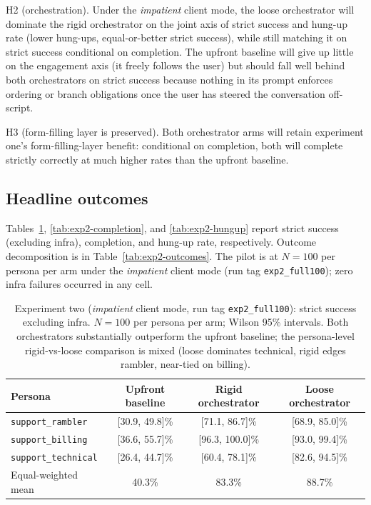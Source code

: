 \documentclass[11pt,a4paper]{article}
\newcommand{\rerunPlaceholderN}{100}
\begin{document}
H2 (orchestration). Under the \emph{impatient} client mode, the loose orchestrator will dominate the rigid orchestrator on the joint axis of strict success and hung-up rate (lower hung-ups, equal-or-better strict success), while still matching it on strict success conditional on completion. The upfront baseline will give up little on the engagement axis (it freely follows the user) but should fall well behind both orchestrators on strict success because nothing in its prompt enforces ordering or branch obligations once the user has steered the conversation off-script.

H3 (form-filling layer is preserved). Both orchestrator arms will retain experiment one's form-filling-layer benefit: conditional on completion, both will complete strictly correctly at much higher rates than the upfront baseline.

\subsection{Headline outcomes}

Tables~\ref{tab:exp2-strict}, \ref{tab:exp2-completion}, and \ref{tab:exp2-hungup} report strict success (excluding infra), completion, and hung-up rate, respectively. Outcome decomposition is in Table~\ref{tab:exp2-outcomes}. The pilot is at $N=\rerunPlaceholderN$ per persona per arm under the \emph{impatient} client mode (run tag \texttt{exp2\_full100}); zero infra failures occurred in any cell.

\begin{table}[htbp]
  \centering
  \caption{Experiment two (\emph{impatient} client mode, run tag \texttt{exp2\_full100}): strict success excluding infra. $N=\rerunPlaceholderN$ per persona per arm; Wilson 95\% intervals. Both orchestrators substantially outperform the upfront baseline; the persona-level rigid-vs-loose comparison is mixed (loose dominates technical, rigid edges rambler, near-tied on billing).}
  \label{tab:exp2-strict}
  \begin{tabular}{lccc}
    \toprule
    Persona & Upfront baseline & Rigid orchestrator & Loose orchestrator \\
    \midrule
    \texttt{support\_rambler}   & [30.9, 49.8]\% & [71.1, 86.7]\%  & [68.9, 85.0]\% \\
    \texttt{support\_billing}   & [36.6, 55.7]\% & [96.3, 100.0]\% & [93.0, 99.4]\% \\
    \texttt{support\_technical} & [26.4, 44.7]\% & [60.4, 78.1]\%  & [82.6, 94.5]\% \\
    \midrule
    Equal-weighted mean         & 40.3\%         & 83.3\%          & 88.7\%         \\
    \bottomrule
  \end{tabular}
\end{table}
\end{document}
